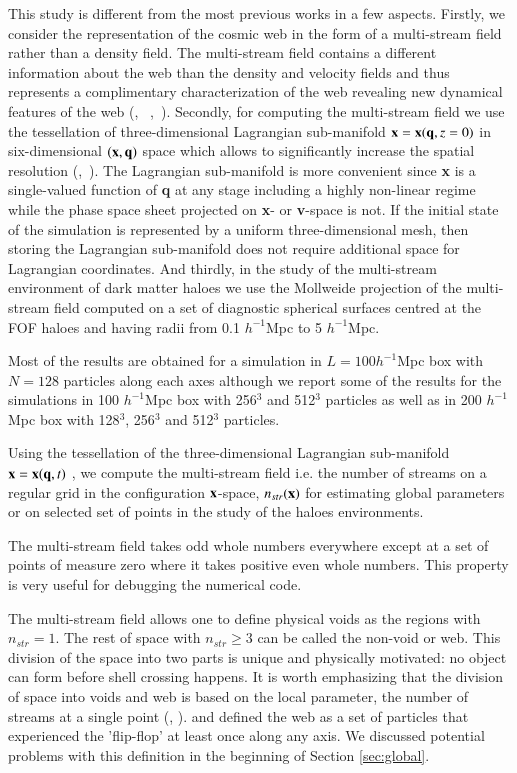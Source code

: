 This study is different from the most previous works in a few aspects.
Firstly, we consider the representation of the cosmic web in the form of  a multi-stream field rather  than a density field.
The multi-stream field contains a different information about the web than the density and velocity fields and thus represents 
a complimentary characterization of the web revealing new dynamical features of the web 
(\citealt{Shandarin2011}, ~\citealt{Shandarin2012},~\citealt{Abel2012}).  Secondly, for computing the multi-stream field we use 
the tessellation of three-dimensional Lagrangian sub-manifold ${\bf x} = {\bf x}({\bf q}, z=0)$ in six-dimensional $({\bf x},{\bf q})$ space
which allows to significantly increase the spatial resolution (\citealt{Shandarin2012},~\citealt{Abel2012}). The Lagrangian sub-manifold is more convenient since
{\bf x}  is a single-valued function of {\bf q} at any stage including a highly non-linear regime while 
the phase space sheet projected on  {\bf x}- or {\bf v}-space is not. If the initial state of the simulation is represented by a uniform three-dimensional mesh, then storing the Lagrangian sub-manifold does not require additional space for Lagrangian coordinates. And thirdly, in the study of the multi-stream environment of dark matter haloes we use the Mollweide projection of the multi-stream field 
computed on a set of diagnostic spherical surfaces centred at the FOF haloes and  having radii from 0.1 $h^{-1}$Mpc to 5 $h^{-1}$Mpc.

Most of the results are obtained for a simulation in $L=100  h^{-1}$Mpc box with $N = 128$  particles along each axes although we report
some of the results for the simulations in 100  $h^{-1}$Mpc box with 256$^3$ and 512$^3$ particles as well as  in 200  $h^{-1}$Mpc
box with 128$^3$, 256$^3$  and 512$^3$ particles.

Using the tessellation of the three-dimensional Lagrangian sub-manifold 
${\bf x} = {\bf x} ({\bf q},t)$  \citep{Shandarin2012}, we compute the multi-stream field i.e. 
the number of streams  on a regular grid in the configuration ${\bf x}$-space, $n_{str}({\bf x})$ for
estimating global parameters or on selected set of points in the study of the haloes environments.

The multi-stream field takes odd whole numbers everywhere except at a set of points of measure zero where it takes positive even whole numbers.
This property is very useful for debugging the numerical code.

 The multi-stream field allows one to define physical voids as the regions with $n_{str} =1$. 
 The rest of space with $n_{str} \ge 3$ can be called the non-void or web.
This division of the space into two parts is unique and physically motivated: no object can form before shell crossing happens. 
It is worth emphasizing that the division of space into voids and web is based on the local parameter, the number of streams at a single point (\citealt{Shandarin2012}, \citealt{Abel2012}). \citet{Falck2012} and \citet{Falck2015} defined the web as a set of particles that experienced the 'flip-flop' at least once along any axis. We discussed potential problems with this definition in the beginning of Section \ref{sec:global}.




